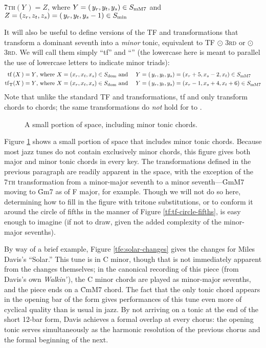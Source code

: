 \vspace{.5\baselineskip}
  \h{7}\textsc{th}$(Y\,) = Z$, where $Y = (\,y_r, y_t, y_s) \in S_{\mathrm{mM7}}$ and
  $Z=(z_r, z_t, z_s)=(\,y_r, y_t, y_s-1) \in S_{\mathrm{min}}$
\vspace{.5\baselineskip}

\noindent It will also be useful to define versions of the TF and \tft
transformations that transform a dominant seventh into a \emph{minor} tonic,
equivalent to TF $\odot$ \textsc{3rd} or \tft $\odot$ \textsc{3rd}. We will
call them simply ``tf'' and ``\tfmt'' (the lowercase here is meant to parallel
the use of lowercase letters to indicate minor triads):
%
{\novspace%
\begin{alignat*}{3}
    \mathrm{tf}\,(X\,) = Y\text{, where}\ X = (x_r, x_t, x_s) \in S_{\mathrm{dom}}
    & \text{ and}\ &
    Y &= (\,y_r, y_t, y_s) = (x_r + 5, x_s - 2, x_t) \in S_{\mathrm{mM7}} \\
    \mathrm{tf}_\mathrm{T}(X\,) = Y\text{, where}\ X = (x_r, x_t, x_s) \in S_{\mathrm{dom}}
    & \text{ and}\ &
    Y &= (\,y_r, y_t, y_s) = (x_r - 1, x_s + 4, x_t + 6) \in S_{\mathrm{mM7}}
\end{alignat*}}%
%
Note that unlike the standard TF and \tft transformations, tf and
\tfmt only transform \V chords to \I chords; the same
transformations do \emph{not} hold for \ii to \V.

\begin{figure}[tbhp]
  \caption{A small portion of \tf space, including minor tonic chords.}
  \label{tfe:tf-minor-tonics}
\end{figure}

Figure \ref{tfe:tf-minor-tonics} shows a small portion of \tf space that
includes minor tonic chords. Because most jazz tunes do not contain
exclusively minor chords, this figure gives both major and minor tonic chords
in every key. The transformations defined in the previous paragraph are
readily apparent in the space, with the exception of the \textsc{7th}
transformation from a minor-major seventh to a minor seventh---\h{GmM7} moving
to \h{Gm7} as \ii of F major, for example. Though we will not do so
here, determining how to fill in the figure with tritone substitutions, or to
conform it around the circle of fifths in the manner of Figure
\ref{tf:tf-circle-fifths}, is easy enough to imagine (if not to draw, given
the added complexity of the minor-major sevenths).

By way of a brief example, Figure \ref{tfe:solar-changes} gives the changes
for Miles Davis's ``Solar.'' This tune is in C minor, though that is not
immediately apparent from the changes themselves; in the canonical recording
of this piece (from Davis's own \emph{Walkin'}\,), the C minor chords are
played as minor-major sevenths, and the piece ends on a \h{CmM7}
chord.\nocite{davis:walkin} The fact that the only tonic chord appears in the
opening bar of the form gives performances of this tune even more of cyclical
quality than is usual in jazz. By not arriving on a tonic at the end of the
short 12-bar form, Davis achieves a formal overlap at every chorus: the
opening tonic serves simultaneously as the harmonic resolution of the previous
chorus and the formal beginning of the next.

